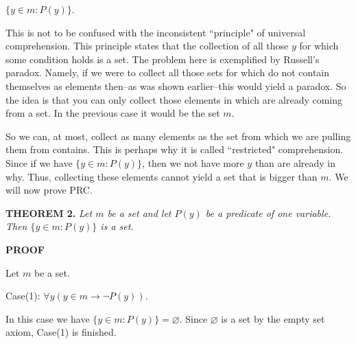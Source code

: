 \documentclass[12pt, a4paper]{article}
\begin{document}
\vspace{4mm}

\centerline{$\{y\in m\colon P(y)\}$.}\par

\vspace{4mm}

\noindent This is not to be confused with the inconsistent ``principle" of universal comprehension. This principle states that the collection of all those $y$ for which some condition holds is a set. The problem here is exemplified by Russell's paradox. Namely, if we were to collect all those sets for which do not contain themselves as elements then--as was shown earlier--this would yield a paradox. So the idea is that you can only collect those elements in which are already coming from a set. In the previous case it would be the set $m$.\par
So we can, at most, collect as many elements as the set from which we are pulling them from contains. This is perhaps why it is called ``restricted" comprehension. Since if we have $\{y\in m\colon P(y)\}$, then we not have more $y$ than are already in why. Thus, collecting these elements cannot yield a set that is bigger than $m$. We will now prove PRC.\par

\vspace{4mm}

\noindent\textbf{THEOREM 2.}\textit{ Let $m$ be a set and let $P(y)$ be a predicate of one variable. Then $\{y\in m\colon P(y)\}$ is a set.}

\vspace{4mm}

\noindent\textbf{PROOF}\par

\vspace{4mm}

\noindent Let $m$ be a set.\par

\vspace{4mm}

Case(1): $\forall y(y\in m\rightarrow\neg P(y))$.\par

\vspace{4mm}
\noindent In this case we have $\{y\in m\colon P(y)\}=\varnothing$. Since $\varnothing$ is a set by the empty set axiom, Case(1) is finished.\par

\vspace{4mm}
\end{document}
